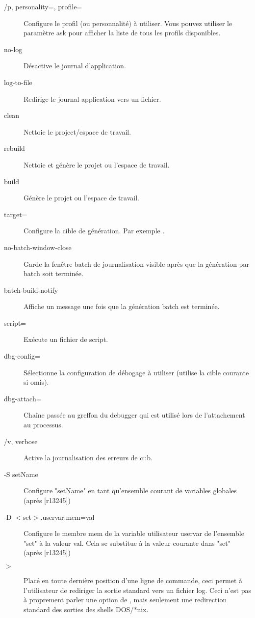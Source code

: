 \begin{description}
\item[/p, \opt{--}personality=, \opt{--}profile=] Configure le profil (ou personnalité) à utiliser. Vous pouvez utiliser le paramètre ask pour afficher la liste de tous les profils disponibles.
\item[\opt{--}no-log] Désactive le journal d'application.
\item[\opt{--}log-to-file] Redirige le journal application vers un fichier.
\item[\opt{--}clean] Nettoie le project/espace de travail.
\item[\opt{--}rebuild] Nettoie et génère le projet ou l'espace de travail.
\item[\opt{--}build] Génère le projet ou l'espace de travail.
\item[\opt{--}target=] Configure la cible de génération. Par exemple .
\item[\opt{--}no-batch-window-close] Garde la fenêtre batch de journalisation visible après que la génération par batch soit terminée.
\item[\opt{--}batch-build-notify] Affiche un message une fois que la génération batch est terminée.
\item[\opt{--}script=] Exécute un fichier de script.
\item[\opt{--}dbg-config=] Sélectionne la configuration de débogage à utiliser (utilise la cible courante si omis).
\item[\opt{--}dbg-attach=] Chaîne passée au greffon du debugger qui est utilisé lors de l'attachement au processus.
\item[/v, \opt{--}verbose] Active la journalisation des erreurs de c::b.
\item[-S setName] Configure "setName" en tant qu'ensemble courant de variables globales (après [r13245])
\item[-D $<$set$>$.uservar.mem=val] Configure le membre mem de la variable utilisateur uservar de l'ensemble "set" à la valeur val. Cela se substitue à la valeur courante dans "set" (après [r13245])
\item[$>$ ] Placé en toute dernière position d'une ligne de commande, ceci permet à l'utilisateur de rediriger la sortie standard vers un fichier log. Ceci n'est pas à proprement parler une option de \codeblocks, mais seulement une redirection standard des sorties des shells DOS/*nix.
\end{description}

